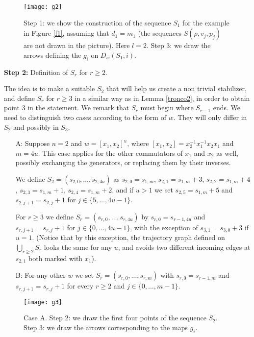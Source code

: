 \documentclass[12pt]{article}
\theoremstyle{definition}
\newcommand{\vs}{\vspace{0.3cm}}
\begin{document}
\begin{figure}[h!] 
\texttt{[image: g2]}
\caption{Step 1: we show the construction of the sequence $S_1$ for the example in Figure \ref{f1}, assuming that $d_1=m_1$ (the sequences $S(\rho,v_j,p_j)$ are not drawn in the picture). Here $l=2$. Step 3: we draw the arrows defining the $g_i$ on $D_w(S_1,i)$.}
\label{f2}
\end{figure}

\vs
{\flushleft \bf Step 2:} Definition of $S_r$ for $r\geq 2$.
\vs


The idea is to make a suitable $S_2$ that will help us create a non trivial stabilizer, and define $S_r$ for $r\geq 3$ in a similar way as in Lemma \ref{tronco2}, in order to obtain point 3 in the statement.  We remark that $S_r$ must begin where $S_{r-1}$ ends.
We need to distinguish two cases according to the form of $w$. They will only differ in $S_2$ and possibly in $S_3$.

\begin{itemize}
\item[A:] Suppose $n=2$ and $w=[x_1,x_2]^u$, where $[x_1,x_2]=x_2^{-1}x_1^{-1}x_2x_1$ and $m=4u$. This case applies for the other commutators of $x_1$ and $x_2$ as well, possibly exchanging the generators, or replacing them by their inverses. 

We define $S_2=(s_{2,0},\ldots,s_{2,4u})$ as  $s_{2,0}=s_{1,m}$, $s_{2,1}=s_{1,m}+3$, $s_{2,2}=s_{1,m}+4$, $s_{2,3}=s_{1,m}+1$, $s_{2,4}=s_{1,m}+2$, and if $u>1$ we set $s_{2,5}=s_{1,m}+5$ and $s_{2,j+1}=s_{2,j}+1$ for $j\in \{5,\ldots,4u-1\}$. 

For $r\geq 3$ we define $S_r=(s_{r,0},\ldots,s_{r,4u})$ by $s_{r,0}=s_{r-1,4u}$ and $s_{r,j+1}=s_{r,j}+1$ for $j\in\{0,\ldots,4u-1\}$, with the exception of $s_{3,1}=s_{3,0}+3$ if $u=1$. (Notice that by this exception, the trajectory graph defined on $\bigcup_{r\geq 2}S_r$ looks the same for any $u$, and avoids two different incoming edges at $s_{2,1}$ both marked with $x_1$). 
\item[B:] For any other $w$ we set $S_r= (s_{r,0},\ldots,s_{r,m})$ with $s_{r,0}=s_{r-1,m}$ and $s_{r,j+1} = s_{r,j}+1$ for every $r\geq 2$ and $j\in\{0,\ldots,m-1\}$. 
\end{itemize}

\begin{figure}[h!] 
\centering
\texttt{[image: g3]}
\caption{Case A. Step 2: we draw the first four points of the sequence $S_2$. Step 3: we draw the arrows corresponding to the maps $g_i$.}
\label{f3}
\end{figure}
\end{document}
